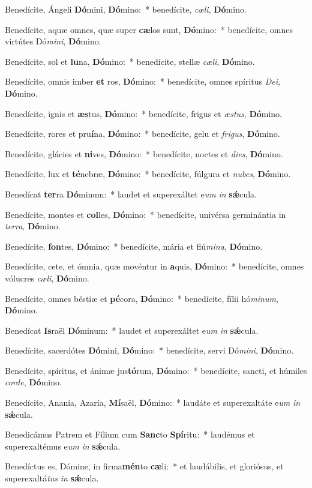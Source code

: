 \item Benedícite, Ángeli \textbf{Dó}mini, \textbf{Dó}mino:~* benedícite, \textit{cæ}\textit{li}, \textbf{Dó}mino.
\item Benedícite, aquæ omnes, quæ super \textbf{cæ}los sunt, \textbf{Dó}mino:~* benedícite, omnes virtútes Dó\textit{mi}\textit{ni}, \textbf{Dó}mino.
\item Benedícite, sol et \textbf{lu}na, \textbf{Dó}mino:~* benedícite, stellæ \textit{cæ}\textit{li}, \textbf{Dó}mino.
\item Benedícite, omnis imber \textbf{et} ros, \textbf{Dó}mino:~* benedícite, omnes spíritus \textit{De}\textit{i}, \textbf{Dó}mino.
\item Benedícite, ignis et \textbf{æs}tus, \textbf{Dó}mino:~* benedícite, frigus et \textit{æs}\textit{tus}, \textbf{Dó}mino.
\item Benedícite, rores et pru\textbf{í}na, \textbf{Dó}mino:~* benedícite, gelu et \textit{fri}\textit{gus}, \textbf{Dó}mino.
\item Benedícite, glácies et \textbf{ni}ves, \textbf{Dó}mino:~* benedícite, noctes et \textit{di}\textit{es}, \textbf{Dó}mino.
\item Benedícite, lux et \textbf{té}nebræ, \textbf{Dó}mino:~* benedícite, fúlgura et \textit{nu}\textit{bes}, \textbf{Dó}mino.
\item Benedícat \textbf{ter}ra \textbf{Dó}minum:~* laudet et superexáltet e\textit{um} \textit{in} \textbf{sǽ}cula.
\item Benedícite, montes et \textbf{col}les, \textbf{Dó}mino:~* benedícite, univérsa germinántia in \textit{ter}\textit{ra}, \textbf{Dó}mino.
\item Benedícite, \textbf{fon}tes, \textbf{Dó}mino:~* benedícite, mária et flú\textit{mi}\textit{na}, \textbf{Dó}mino.
\item Benedícite, cete, et ómnia, quæ movéntur in \textbf{a}quis, \textbf{Dó}mino:~* benedícite, omnes vólucres \textit{cæ}\textit{li}, \textbf{Dó}mino.
\item Benedícite, omnes béstiæ et \textbf{pé}cora, \textbf{Dó}mino:~* benedícite, fílii hó\textit{mi}\textit{num}, \textbf{Dó}mino.
\item Benedícat \textbf{Is}raël \textbf{Dó}minum:~* laudet et superexáltet e\textit{um} \textit{in} \textbf{sǽ}cula.
\item Benedícite, sacerdótes \textbf{Dó}mini, \textbf{Dó}mino:~* benedícite, servi Dó\textit{mi}\textit{ni}, \textbf{Dó}mino.
\item Benedícite, spíritus, et ánimæ jus\textbf{tó}rum, \textbf{Dó}mino:~* benedícite, sancti, et húmiles \textit{cor}\textit{de}, \textbf{Dó}mino.
\item Benedícite, Ananía, Azaría, \textbf{Mí}saël, \textbf{Dó}mino:~* laudáte et superexaltáte e\textit{um} \textit{in} \textbf{sǽ}cula.
\item Benedicámus Patrem et Fílium cum \textbf{Sanc}to \textbf{Spí}ritu:~* laudémus et superexaltémus e\textit{um} \textit{in} \textbf{sǽ}cula.
\item Benedíctus es, Dómine, in firma\textbf{mén}to \textbf{cæ}li:~* et laudábilis, et gloriósus, et superexaltá\textit{tus} \textit{in} \textbf{sǽ}cula.
